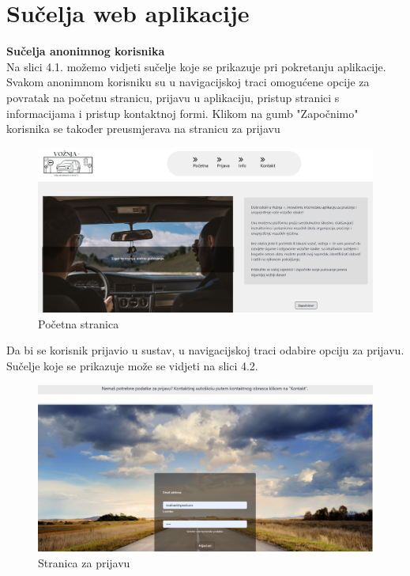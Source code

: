 \chapter{Sučelja web aplikacije}
\noindent \textbf{Sučelja anonimnog korisnika}\\
\noindent Na slici 4.1. možemo vidjeti sučelje koje se prikazuje pri pokretanju aplikacije. Svakom anonimnom korisniku su u navigacijskoj traci omogućene opcije za povratak na početnu stranicu, prijavu u aplikaciju, pristup stranici s informacijama i pristup kontaktnoj formi. Klikom na gumb "Započnimo" korisnika se također preusmjerava na stranicu za prijavu
\begin{figure}[H]
					\includegraphics[width=\textwidth]{slike/anoniman1.png} 
					\centering
					\caption{Početna stranica}
					\label{fig:promjene}
				\end{figure}

\noindent Da bi se korisnik prijavio u sustav, u navigacijskoj traci odabire opciju za prijavu. Sučelje koje se prikazuje može se vidjeti na slici 4.2.

\begin{figure}[H]
					\includegraphics[width=\textwidth]{slike/anoniman2.png} 
					\centering
					\caption{Stranica za prijavu}
					\label{fig:promjene}
				\end{figure}

